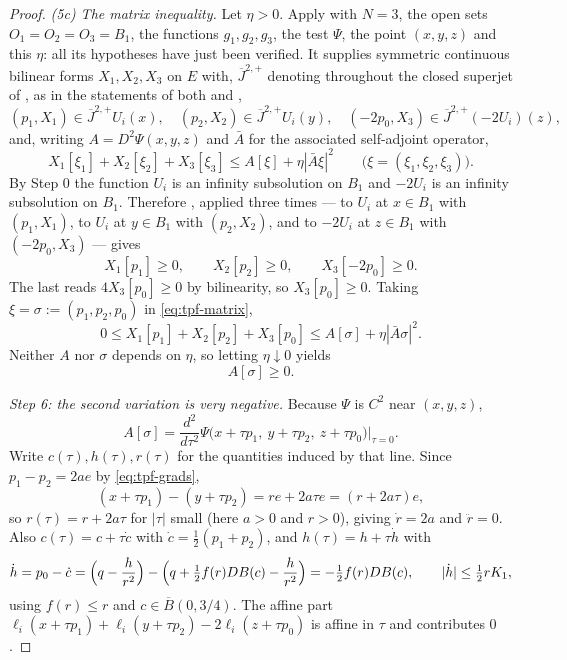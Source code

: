\begin{proof}
\emph{(5c) The matrix inequality.} Let $\eta>0$. Apply 
with $N=3$, the open sets $O_1=O_2=O_3=B_1$, the functions $g_1,g_2,g_3$, the
test $\Psi$, the point $(x,y,z)$ and this $\eta$: all its hypotheses have just
been verified. It supplies symmetric continuous bilinear forms $X_1,X_2,X_3$ on
$E$ with, $\overline J^{2,+}$ denoting throughout the closed superjet of
, as in the statements of both  and
,
\begin{equation}\label{eq:tpf-jets}
  (p_1,X_1)\in\overline J^{2,+}U_i(x),\quad
  (p_2,X_2)\in\overline J^{2,+}U_i(y),\quad
  (-2p_0,X_3)\in\overline J^{2,+}(-2U_i)(z),
\end{equation}
and, writing $A=D^2\Psi(x,y,z)$ and $\bar A$ for the associated self-adjoint
operator,
\begin{equation}\label{eq:tpf-matrix}
  X_1[\xi_1]+X_2[\xi_2]+X_3[\xi_3]\le A[\xi]+\eta|\bar A\xi|^2
  \qquad\bigl(\xi=(\xi_1,\xi_2,\xi_3)\bigr).
\end{equation}
By Step 0 the function $U_i$ is an infinity subsolution on $B_1$ and $-2U_i$ is
an infinity subsolution on $B_1$. Therefore
, applied three times --- to $U_i$ at
$x\in B_1$ with $(p_1,X_1)$, to $U_i$ at $y\in B_1$ with $(p_2,X_2)$, and to
$-2U_i$ at $z\in B_1$ with $(-2p_0,X_3)$ --- gives
\[
  X_1[p_1]\ge0,\qquad X_2[p_2]\ge0,\qquad X_3[-2p_0]\ge0 .
\]
The last reads $4X_3[p_0]\ge0$ by bilinearity, so $X_3[p_0]\ge0$. Taking
$\xi=\sigma:=(p_1,p_2,p_0)$ in \eqref{eq:tpf-matrix},
\[
  0\le X_1[p_1]+X_2[p_2]+X_3[p_0]\le A[\sigma]+\eta|\bar A\sigma|^2 .
\]
Neither $A$ nor $\sigma$ depends on $\eta$, so letting $\eta\downarrow0$ yields
\begin{equation}\label{eq:tpf-Apos}
  A[\sigma]\ge0 .
\end{equation}

\emph{Step 6: the second variation is very negative.}
Because $\Psi$ is $C^2$ near $(x,y,z)$,
\[
  A[\sigma]=\frac{d^2}{d\tau^2}
   \Psi\bigl(x+\tau p_1,\ y+\tau p_2,\ z+\tau p_0\bigr)\Big|_{\tau=0}.
\]
Write $c(\tau),h(\tau),r(\tau)$ for the quantities induced by that line. Since
$p_1-p_2=2ae$ by \eqref{eq:tpf-grads},
\[
  (x+\tau p_1)-(y+\tau p_2)=re+2a\tau e=(r+2a\tau)e,
\]
so $r(\tau)=r+2a\tau$ for $|\tau|$ small (here $a>0$ and $r>0$), giving
$\dot r=2a$ and $\ddot r=0$. Also $c(\tau)=c+\tau\dot c$ with
$\dot c=\tfrac12(p_1+p_2)$, and $h(\tau)=h+\tau\dot h$ with
\[
  \dot h=p_0-\dot c
   =\Bigl(q-\frac h{r^2}\Bigr)-\Bigl(q+\tfrac12f(r)DB(c)-\frac h{r^2}\Bigr)
   =-\tfrac12f(r)DB(c),
  \qquad|\dot h|\le\tfrac12rK_1 ,
\]
using $f(r)\le r$ and $c\in\overline B(0,3/4)$. The affine part
$\ell_i(x+\tau p_1)+\ell_i(y+\tau p_2)-2\ell_i(z+\tau p_0)$ is affine in $\tau$
and contributes $0$.


\end{proof}
